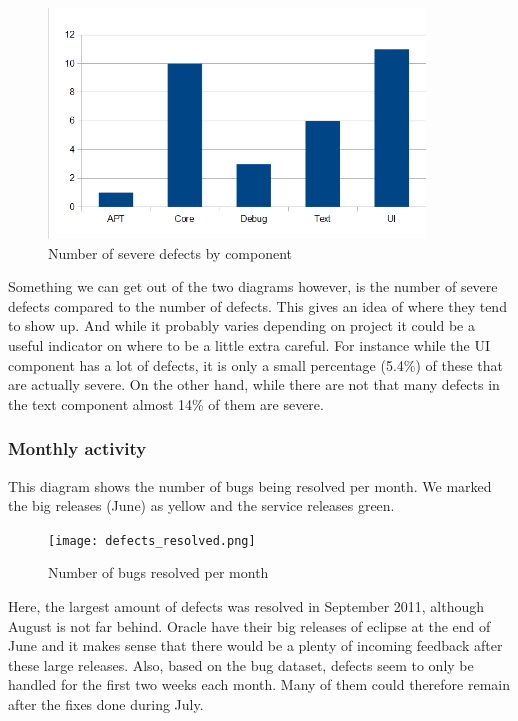 \documentclass{article}
\begin{document}
\begin{figure}[H]
\center
\includegraphics[width=100mm]{severe_defects_per_component.png}
\caption{Number of severe defects by component}
\end{figure}

Something we can get out of the two diagrams however, is the number of severe defects compared to the number of defects.
This gives an idea of where they tend to show up.
And while it probably varies depending on project it could be a useful indicator on where to be a little extra careful.
For instance while the UI component has a lot of defects, it is only a small percentage (5.4\%) of these that are actually severe.
On the other hand, while there are not that many defects in the text component almost 14\% of them are severe.

\subsubsection{Monthly activity}
This diagram shows the number of bugs being resolved per month.
We marked the big releases (June) as yellow and the service releases green.
\begin{figure}[H]
\center
\texttt{[image: defects\_resolved.png]}
\caption{Number of bugs resolved per month}
\end{figure}
Here, the largest amount of defects was resolved in September 2011, although August is not far behind. 
Oracle have their big releases of eclipse at the end of June and it makes sense that there would be a plenty of incoming feedback after these large releases.
Also, based on the bug dataset, defects seem to only be handled for the first two weeks each month.
Many of them could therefore remain after the fixes done during July.
\end{document}
